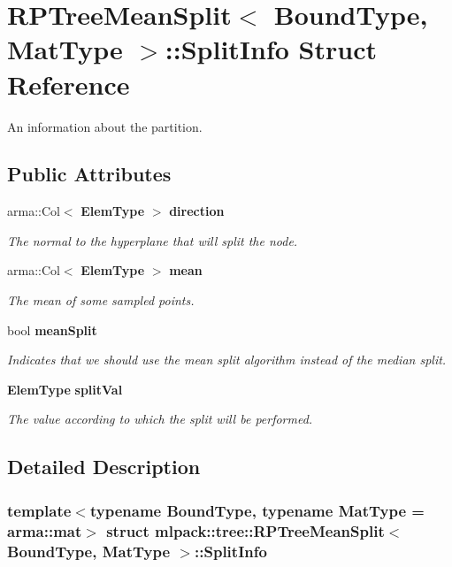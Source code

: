 \section{R\+P\+Tree\+Mean\+Split$<$ Bound\+Type, Mat\+Type $>$\+:\+:Split\+Info Struct Reference}
\label{structmlpack_1_1tree_1_1RPTreeMeanSplit_1_1SplitInfo}


An information about the partition.  


\subsection*{Public Attributes}
\begin{DoxyCompactItemize}
\item 
arma\+::\+Col$<$ \textbf{ Elem\+Type} $>$ \textbf{ direction}
\begin{DoxyCompactList}\small\item\em The normal to the hyperplane that will split the node. \end{DoxyCompactList}\item 
arma\+::\+Col$<$ \textbf{ Elem\+Type} $>$ \textbf{ mean}
\begin{DoxyCompactList}\small\item\em The mean of some sampled points. \end{DoxyCompactList}\item 
bool \textbf{ mean\+Split}
\begin{DoxyCompactList}\small\item\em Indicates that we should use the mean split algorithm instead of the median split. \end{DoxyCompactList}\item 
\textbf{ Elem\+Type} \textbf{ split\+Val}
\begin{DoxyCompactList}\small\item\em The value according to which the split will be performed. \end{DoxyCompactList}\end{DoxyCompactItemize}


\subsection{Detailed Description}
\subsubsection*{template$<$typename Bound\+Type, typename Mat\+Type = arma\+::mat$>$\newline
struct mlpack\+::tree\+::\+R\+P\+Tree\+Mean\+Split$<$ Bound\+Type, Mat\+Type $>$\+::\+Split\+Info}

